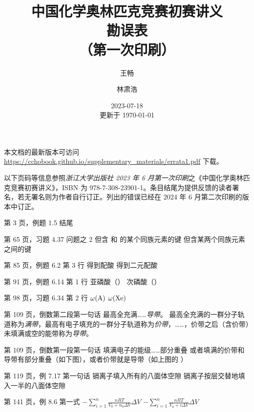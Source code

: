 \documentclass{errata}
\title{中国化学奥林匹克竞赛初赛讲义 \\ {\bfseries 勘误表} \\ （第一次印刷）}
\author{王畅 \and 林肃浩}
\date{2023-07-18 \\ 更新于 \today}
\begin{document}
    \maketitle
    本文档的最新版本可访问 \url{https://cchobook.github.io/supplementary_materials/errata1.pdf} 下载。

    以下页码等信息参照\emph{浙江大学出版社 2023 年 6 月第一次印刷}之《中国化学奥林匹克竞赛初赛讲义》，ISBN 为 978-7-308-23901-1。条目结尾为提供反馈的读者署名，若无署名则为作者自行订正。列出的错误已经在 2024 年 6 月第二次印刷的版本中订正。

    \begin{Errata}
        \item[第 3 页，例题 1.5 结尾]
            \Orig {}
            \Corr {}
        \item[第 65 页，习题 4.37 问题之 2 \cite{otten2009complexation}]
            \Orig 但含  和  的某个同族元素的键
            \Corr 但含某两个同族元素之间的键
        \item[第 85 页，例题 6.2 第 3 行]
            \Orig 得到配酸 
            \Corr 得到二元配酸 
        \item[第 91 页，例题 6.14 第 1 行]
            \Orig 亚磷酸（）
            \Corr 次磷酸（）
        \item[第 98 页，习题 6.34 第 2 行]
            \Orig $\omega(\ce{A})$
            \Corr $\omega(\ce{Xe})$
        \item[第 109 页，倒数第二段第一句话]
            \Orig 最高全充满……\emph{导带}。
            \Corr 最高全充满的一群分子轨道称为\emph{满带}，最高有电子填充的一群分子轨道称为\emph{价带}，……，价带之后（含价带）未填满或空的能带称为\emph{导带}。
        \item[第 109 页，倒数第一段第一句话]
            \Orig 填满电子的能级……部分重叠
            \Corr 或者填满的价带和导带有部分重叠（如下图），或者价带就是导带（如上图的 ）
        \item[第 119 页，例 7.17 第一句话]
            \Orig 镉离子填入所有的八面体空隙
            \Corr 镉离子按层交替地填入一半的八面体空隙
        \item[第 141 页，例 8.6 第一式]
            \Orig $-\sum_{i=1}^n \frac{nRT}{V_0+n_0 \Delta V} \Delta V$
            \Corr $-\sum_{i=1}^n \frac{nRT}{V_0+i \Delta V} \Delta V$

\end{Errata}
\end{document}
